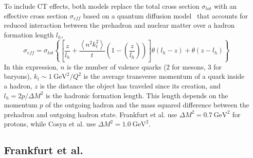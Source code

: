 To include CT effects, both models replace the total cross section
$\sigma_{tot}$ with an effective cross section $\sigma_{eff}$
based on a quantum diffusion model~\cite{Farrar_1988}
that accounts for reduced interaction between the prehadron and nuclear matter
over a hadron formation length $l_h$,
\begin{equation}
    \sigma_{eff} = \sigma_{tot}
    \left\{
        \left[\frac{z}{l_h} +
               \frac{\left\langle n^{2} k_{t}^{2}\right\rangle}{t} \left(1-\left(\frac{z}{l_h}\right)\right)
        \right]
        \theta\left(l_h-z\right) +
        \theta\left(z-l_h\right)
    \right\}
\end{equation}
In this expression,
$n$ is the number of valence quarks (2 for mesons, 3 for baryons),
$k_t \sim \SI{1}{\giga\electronvolt\squared}/Q^2$
is the average transverse momentum of a quark inside a hadron,
$z$ is the distance the object has traveled since its creation,
and
$l_h=2p/\Delta M^2$ is the hadronic formation length.
This length depends on
the momentum $p$ of the outgoing hadron
and
the mass squared difference between the prehadron and outgoing hadron state.
Frankfurt et al. use $\Delta M^2 = \SI{0.7}{\giga\electronvolt\squared}$
for protons, while
Cosyn et al. use $\Delta M^2 = \SI{1.0}{\giga\electronvolt\squared}$.

\subsection{Frankfurt et al.}



